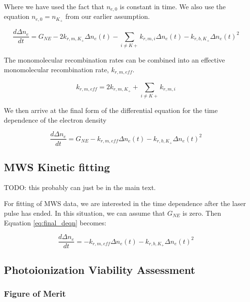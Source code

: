 Where we have used the fact that $n_{e,0}$ is constant in time. We also use the equation $n_{e,0} = n_{K_{+}}$ from our earlier assumption. 

\begin{equation}
\frac{d\Delta n_{e}}{dt} = G_{NE}   -   2k_{r, m, K_{+}}\Delta n_{e}(t) - \sum_{i \neq K+}^{}k_{r, m, i}\Delta n_{e}(t) - k_{r, b, K_{+}}\Delta n_{e}(t)^2
\end{equation}

The monomolecular recombination rates can be combined into an effective monomolecular recombination rate, $k_{r, m, eff}$. 

\begin{equation}
  k_{r, m, eff} = 2k_{r, m, K_{+}} + \sum_{i \neq K+}^{}k_{r, m, i}
\end{equation}

We then arrive at the final form of the differential equation for the time dependence of the electron density

\begin{equation}
  \label{eq:final_deqn}
\frac{d\Delta n_{e}}{dt} = G_{NE}   -   k_{r, m, eff}\Delta n_{e}(t) - k_{r, b, K_{+}}\Delta n_{e}(t)^2
\end{equation}



\subsection{MWS Kinetic fitting}

TODO: this probably can just be in the main text. 

For fitting of MWS data, we are interested in the time dependence after the laser pulse has ended. In this situation, we can assume that $G_{NE}$ is zero. Then Equation \ref{eq:final_deqn} becomes: 

\begin{equation}
\frac{d\Delta n_{e}}{dt} =   -   k_{r, m, eff}\Delta n_{e}(t)  - k_{r, b, K_{+}}\Delta n_{e}(t)^2
\end{equation}




\subsection{Photoionization Viability Assessment}

\subsubsection{Figure of Merit}

